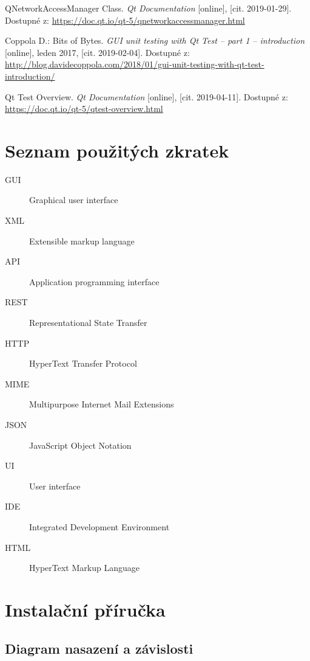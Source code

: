 \documentclass[thesis=B,czech]{FITthesis}[2012/06/26]
\begin{document}
\begin{thebibliography}{15}
	  QNetworkAccessManager Class. \textit{Qt Documentation} [online], [cit. 2019-01-29]. Dostupné z: \url{https://doc.qt.io/qt-5/qnetworkaccessmanager.html}
	
	  Coppola D.: Bits of Bytes. \textit{GUI unit testing with Qt Test – part 1 – introduction} [online], leden 2017, [cit. 2019-02-04]. Dostupné z: \url{http://blog.davidecoppola.com/2018/01/gui-unit-testing-with-qt-test-introduction/}		
	
	  Qt Test Overview. \textit{Qt Documentation} [online], [cit. 2019-04-11]. Dostupné z: \url{https://doc.qt.io/qt-5/qtest-overview.html}
	
\end{thebibliography}


\appendix

\chapter{Seznam použitých zkratek}
\begin{description}
	\item[GUI] Graphical user interface
	\item[XML] Extensible markup language
	\item[API] Application programming interface
	\item[REST] Representational State Transfer
	\item[HTTP] HyperText Transfer Protocol
	\item[MIME] Multipurpose Internet Mail Extensions
	\item[JSON] JavaScript Object Notation
	\item[UI] User interface
	\item[IDE] Integrated Development Environment
	\item[HTML] HyperText Markup Language
\end{description}

\chapter{Instalační příručka}

\section{Diagram nasazení a závislosti}
\end{document}
